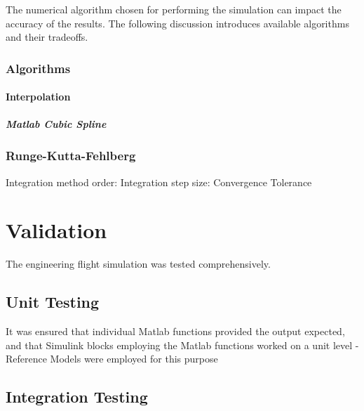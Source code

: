 \documentclass[]{book}
\let\oldparagraph\paragraph
\renewcommand{\paragraph}[1]{\oldparagraph{#1}\mbox{}}
\begin{document}
The numerical algorithm chosen for performing the simulation can impact
the accuracy of the results. The following discussion introduces
available algorithms and their tradeoffs.

\subsection{Algorithms}\label{algorithms}

\subsubsection{Interpolation}\label{interpolation}

\paragraph{Matlab Cubic Spline}\label{matlab-cubic-spline}

\subsubsection{}\label{section}

\subsection{Runge-Kutta-Fehlberg}\label{runge-kutta-fehlberg}

Integration method order: Integration step size: Convergence Tolerance

\chapter{Validation}\label{validation-1}

The engineering flight simulation was tested comprehensively.

\section{Unit Testing}\label{unit-testing}

It was ensured that individual Matlab functions provided the output
expected, and that Simulink blocks employing the Matlab functions worked
on a unit level - Reference Models were employed for this purpose

\section{Integration Testing}\label{integration-testing}
\end{document}
